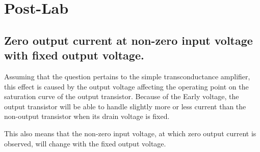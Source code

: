 

\newcommand{\reffig}[1]{Fig.~\ref{#1}}



\newpage
\section{Post-Lab}
\subsection{Zero output current at non-zero input voltage with fixed output voltage.}
Assuming that the question pertains to the simple transconductance amplifier, this effect
is caused by the output voltage affecting the operating point on the saturation curve of the
output transistor. Because of the Early voltage, the output transistor will be able to handle
slightly more or less current than the non-output transistor when its drain voltage is fixed.

This also means that the non-zero input voltage, at which zero output current is observed, will
change with the fixed output voltage.
